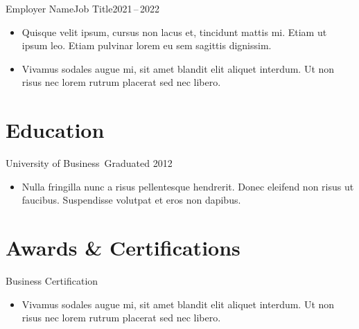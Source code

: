 \documentclass{cv}
\begin{document}
\begin{entry}{Employer Name}{Job Title}{2021\,--\,2022}
	\begin{itemize}

	\item	Quisque velit ipsum, cursus non lacus et, tincidunt mattis mi. 
			Etiam ut ipsum leo. Etiam pulvinar lorem eu sem sagittis dignissim. 

	\item	Vivamus sodales augue mi, sit amet blandit elit aliquet interdum. 
			Ut non risus nec lorem rutrum placerat sed nec libero. 

	\end{itemize}
\end{entry}

\section*{Education}

\begin{entry}{University of Business}{~}{Graduated 2012}
	\begin{itemize}

	\item	Nulla fringilla nunc a risus pellentesque hendrerit. Donec eleifend non 
			risus ut faucibus. Suspendisse volutpat et eros non dapibus. 

	\end{itemize}
\end{entry}

\section*{Awards \& Certifications}

\begin{entry}{Business Certification}{~}{~}
	\begin{itemize}

	\item	Vivamus sodales augue mi, sit amet blandit elit aliquet interdum. 
			Ut non risus nec lorem rutrum placerat sed nec libero. 

	\end{itemize}
\end{entry}
\end{document}
